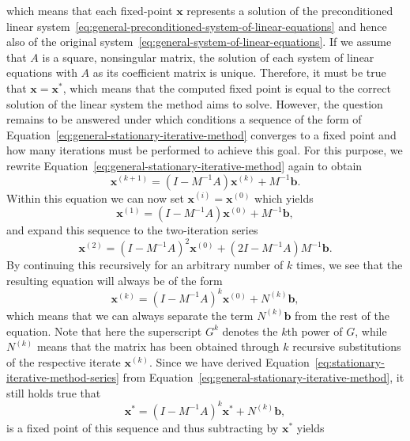 which means that each fixed-point $\bm{x}$ represents a solution of the preconditioned linear system~\eqref{eq:general-preconditioned-system-of-linear-equations} and hence also of the original system~\eqref{eq:general-system-of-linear-equations}.
If we assume that $A$ is a square, nonsingular matrix, the solution of each system of linear equations with $A$ as its coefficient matrix is unique. 
Therefore, it must be true that $\bm{x} = \bm{x}^{*}$, which means that the computed fixed point is equal to the correct solution of the linear system the method aims to solve.
However, the question remains to be answered under which conditions a sequence of the form of Equation~\eqref{eq:general-stationary-iterative-method} converges to a fixed point and how many iterations must be performed to achieve this goal.
For this purpose, we rewrite Equation~\eqref{eq:general-stationary-iterative-method} again to obtain
\begin{equation}
	\bm{x}^{(k+1)} = (I - M^{-1} A) \bm{x}^{(k)} + M^{-1}\bm b.
\end{equation}
Within this equation we can now set $\bm{x}^{(i)} = \bm{x}^{(0)}$ which yields
\begin{equation*}
	\bm{x}^{(1)} = (I - M^{-1} A) \bm{x}^{(0)} + M^{-1}\bm b,
\end{equation*}
and expand this sequence to the two-iteration series
\begin{equation*}
	\bm{x}^{(2)} = (I - M^{-1} A)^2 \bm{x}^{(0)} + (2I - M^{-1} A)M^{-1} \bm{b}.
\end{equation*}
By continuing this recursively for an arbitrary number of $k$ times, we see that the resulting equation will always be of the form
\begin{equation}
	\bm{x}^{(k)} = (I - M^{-1} A)^k \bm{x}^{(0)} + N^{(k)}\bm{b},
	\label{eq:stationary-iterative-method-series}
\end{equation}
which means that we can always separate the term $N^{(k)}\bm{b}$ from the rest of the equation.
Note that here the superscript $G^k$ denotes the $k$th power of $G$, while $N^{(k)}$ means that the matrix has been obtained through $k$ recursive substitutions of the respective iterate $\bm{x}^{(k)}$.
Since we have derived Equation~\eqref{eq:stationary-iterative-method-series} from Equation~\eqref{eq:general-stationary-iterative-method}, it still holds true that
\begin{equation}
	\bm{x}^{*} = (I - M^{-1} A)^k \bm{x}^{*} + N^{(k)}\bm{b},
\end{equation}
is a fixed point of this sequence and thus subtracting by $\bm{x}^{*}$ yields
